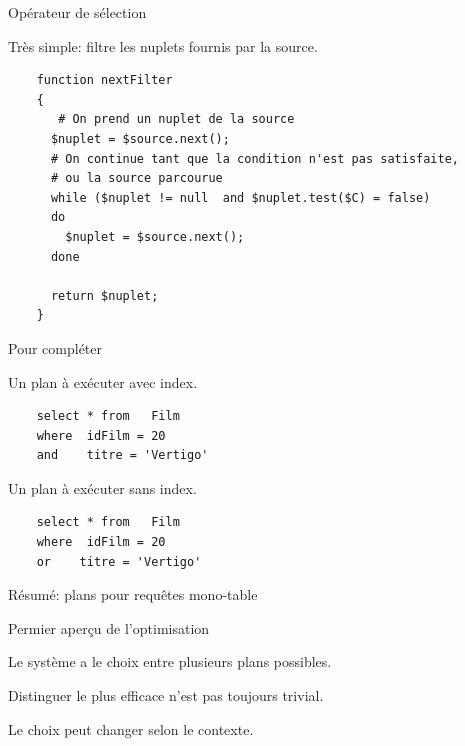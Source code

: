 \begin{frame}[fragile]{Opérateur de sélection}

Très simple: filtre les nuplets fournis par la source.

\begin{verbatim}
    function nextFilter
    {
       # On prend un nuplet de la source
      $nuplet = $source.next();
      # On continue tant que la condition n'est pas satisfaite, 
      # ou la source parcourue
      while ($nuplet != null  and $nuplet.test($C) = false)
      do
        $nuplet = $source.next();        
      done
      
      return $nuplet;
    }
\end{verbatim}

\end{frame}



\begin{frame}[fragile]{Pour compléter}

Un plan à exécuter avec index.

\begin{verbatim}
    select * from   Film
    where  idFilm = 20 
    and    titre = 'Vertigo'
\end{verbatim}

\vfill

Un plan à exécuter sans index.

\begin{verbatim}
    select * from   Film
    where  idFilm = 20 
    or    titre = 'Vertigo'
\end{verbatim}

\end{frame}


\begin{frame}{Résumé: plans pour requêtes mono-table}

Permier aperçu de l'optimisation

\vfill

\begin{redbullet}
  \item Le système a le choix entre plusieurs plans possibles.
  \item Distinguer le plus efficace n'est pas toujours trivial.
  \item Le choix peut changer selon le contexte.
\end{redbullet}


\vfill



\end{frame}

